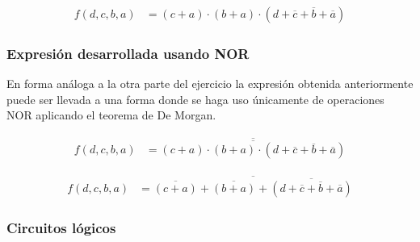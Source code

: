 \begin{align*}
f(d,c,b,a) & = {(c+a)}
\cdot {(b+a)}
\cdot {(d+\overline{c}+\overline{b}+\overline{a})} 
\end{align*}

\subsubsection{Expresión desarrollada usando NOR}
En forma an\'aloga a la otra parte del ejercicio la expresi\'on obtenida anteriormente puede ser llevada a una forma donde se haga
uso \'unicamente de operaciones NOR aplicando el teorema de De Morgan.

\begin{align*}
f(d,c,b,a) & = \overline{
    \overline{
        {(c+a)}
        \cdot {(b+a)}
        \cdot {(d+\overline{c}+\overline{b}+\overline{a})} 
    }
}
\end{align*}

\begin{align*}
f(d,c,b,a) & = \overline{
    \overline{(c+a)}
    + \overline{(b+a)}
    + \overline{(d+\overline{c}+\overline{b}+\overline{a})} 
}
\end{align*}

\subsubsection{Circuitos lógicos}

